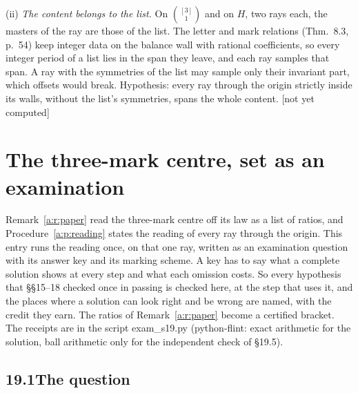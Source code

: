 \documentclass[11pt]{article}
\theoremstyle{plain}
\theoremstyle{definition}
\theoremstyle{remark}
\renewcommand{\thesection}{15}
\renewcommand{\theproposition}{15.\arabic{proposition}}
\newcommand{\notyet}{\textup{[not yet computed]}}
\begin{document}
(ii) \emph{The content belongs to the list.} On $\binom{[3]}1$ and on $H$, two rays each, the masters of the ray are those of the list. The letter and mark relations (Thm.~8.3, p.~54) keep integer data on the balance wall with rational coefficients, so every integer period of a list lies in the span they leave, and each ray samples that span. A ray with the symmetries of the list may sample only their invariant part, which offsets would break. Hypothesis: every ray through the origin strictly inside its walls, without the list's symmetries, spans the whole content. \notyet

\renewcommand{\thesection}{19}
\setcounter{proposition}{0}
\renewcommand{\theproposition}{19.\arabic{proposition}}

\section{The three-mark centre, set as an examination}

Remark~\ref{a:r:paper} read the three-mark centre off its law as a list of ratios, and Procedure~\ref{a:p:reading} states the reading of every ray through the origin. This entry runs the reading once, on that one ray, written as an examination question with its answer key and its marking scheme. A key has to say what a complete solution shows at every step and what each omission costs. So every hypothesis that \S\S15--18 checked once in passing is checked here, at the step that uses it, and the places where a solution can look right and be wrong are named, with the credit they earn. The ratios of Remark~\ref{a:r:paper} become a certified bracket. The receipts are in the script exam\_s19.py (python-flint: exact arithmetic for the solution, ball arithmetic only for the independent check of \S19.5).

\subsection*{19.1\quad The question}
\end{document}
